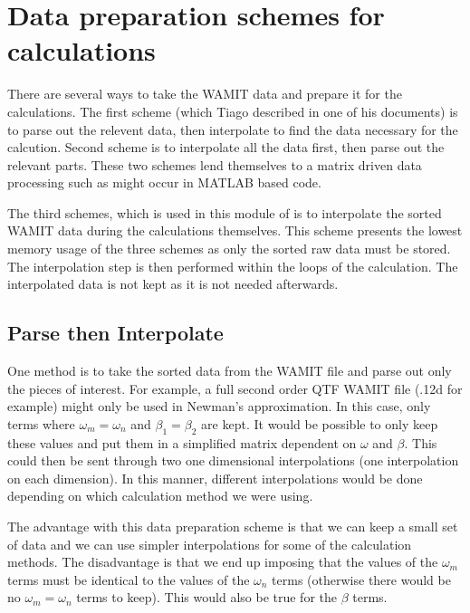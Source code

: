 \chapter{Data preparation schemes for calculations}
\label{app:DataPrepScheme}

There are several ways to take the WAMIT data and prepare it for the calculations.  The first scheme (which Tiago described in one of his documents) is to parse out the relevent data, then interpolate to find the data necessary for the calcution.  Second scheme is to interpolate all the data first, then parse out the relevant parts.  These two schemes lend themselves to a matrix driven data processing such as might occur in MATLAB based code.

The third schemes, which is used in this module of \HD is to interpolate the sorted WAMIT data during the calculations themselves. This scheme presents the lowest memory usage of the three schemes as only the sorted raw data must be stored.  The interpolation step is then performed within the loops of the calculation.  The interpolated data is not kept as it is not needed afterwards.


\section{Parse then Interpolate}
One method is to take the sorted data from the WAMIT file and parse out only the pieces of interest.  For example, a full second order QTF WAMIT file (.12d for example) might only be used in Newman's approximation.  In this case, only terms where $\omega_m = \omega_n$ and $\beta_1 = \beta_2$ are kept.  It would be possible to only keep these values and put them in a simplified matrix dependent on $\omega$ and $\beta$.  This could then be sent through two one dimensional interpolations (one interpolation on each dimension). In this manner, different interpolations would be done depending on which calculation method we were using.

The advantage with this data preparation scheme is that we can keep a small set of data and we can use simpler interpolations for some of the calculation methods.  The disadvantage is that we end up imposing that the values of the $\omega_m$ terms must be identical to the values of the $\omega_n$ terms (otherwise there would be no $\omega_m = \omega_n$ terms to keep).  This would also be true for the $\beta$ terms.  

